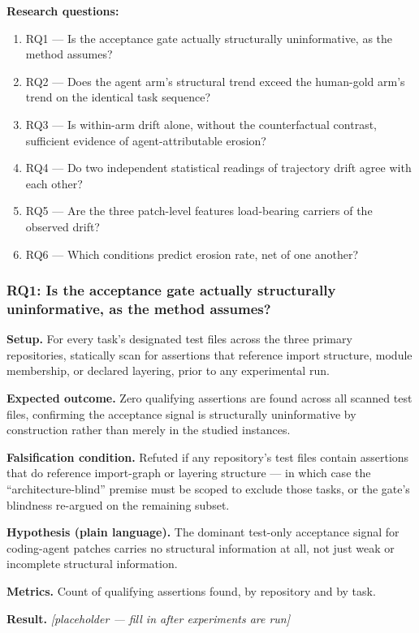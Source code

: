 \documentclass[11pt]{article}
\newcommand{\ph}{\textit{[placeholder --- fill in after experiments are run]}}
\begin{document}
\textbf{Research questions:}
\begin{enumerate}[leftmargin=1.6em]
\item RQ1 --- Is the acceptance gate actually structurally uninformative, as the method assumes?
\item RQ2 --- Does the agent arm's structural trend exceed the human-gold arm's trend on the identical task sequence?
\item RQ3 --- Is within-arm drift alone, without the counterfactual contrast, sufficient evidence of agent-attributable erosion?
\item RQ4 --- Do two independent statistical readings of trajectory drift agree with each other?
\item RQ5 --- Are the three patch-level features load-bearing carriers of the observed drift?
\item RQ6 --- Which conditions predict erosion rate, net of one another?
\end{enumerate}

\subsubsection{RQ1: Is the acceptance gate actually structurally uninformative, as the method assumes?}
\textbf{Setup.} For every task's designated test files across the three primary repositories, statically scan for assertions that reference import structure, module membership, or declared layering, prior to any experimental run.

\textbf{Expected outcome.} Zero qualifying assertions are found across all scanned test files, confirming the acceptance signal is structurally uninformative by construction rather than merely in the studied instances.

\textbf{Falsification condition.} Refuted if any repository's test files contain assertions that do reference import-graph or layering structure --- in which case the ``architecture-blind'' premise must be scoped to exclude those tasks, or the gate's blindness re-argued on the remaining subset.

\textbf{Hypothesis (plain language).} The dominant test-only acceptance signal for coding-agent patches carries no structural information at all, not just weak or incomplete structural information.

\textbf{Metrics.} Count of qualifying assertions found, by repository and by task.

\textbf{Result.} \ph
\end{document}
